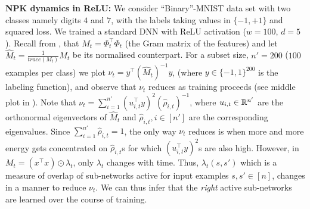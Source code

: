 \textbf{NPK dynamics in ReLU:} We consider ``Binary''-MNIST data set with two classes namely digits $4$ and $7$, with the labels taking values in $\{-1,+1\}$ and squared loss. We trained a standard DNN with ReLU activation ($w=100$, $d=5$). Recall from , that $M_t=\Phi^\top_t\Phi_t$  (the Gram matrix of the features) and let $\widehat{M}_t=\frac{1}{trace(M_t)}M_t$ be its normalised counterpart. For a subset size, $n'=200$ ($100$ examples per class) we plot $\nu_t=y^\top (\widehat{M}_t)^{-1} y$, (where $y\in\{-1,1\}^{200}$ is the labeling function), and observe that $\nu_t$ reduces as training proceeds (see middle plot in ). Note that $\nu_t=\sum_{i=1}^{n'}(u_{i,t}^\top y)^2 (\hat{\rho}_{i,t})^{-1}$, where $u_{i,t}\in \mathbb{R}^{n'}$ are the orthonormal eigenvectors of $\widehat{M}_t$ and $\hat{\rho}_{i,t},i\in[n']$ are the corresponding eigenvalues. Since $\sum_{i=1}^{n'}\hat{\rho}_{i,t}=1$, the only way $\nu_t$ reduces is when more and more energy gets concentrated on $\hat{\rho}_{i,t}$s for which $(u_{i,t}^\top y)^2$s are also high. However, in $M_t=(x^\top x)\odot \lambda_t$, only $\lambda_t$ changes with time. Thus, $\lambda_t(s,s')$ which is a measure of overlap of sub-networks active for input examples $s,s'\in[n]$, changes in a manner to reduce $\nu_t$. We can thus infer that the \emph{right} active sub-networks are learned over the course of training.


